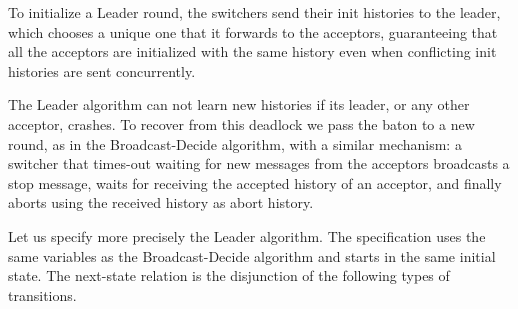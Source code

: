 To initialize a Leader round, the switchers send their init histories to the leader, which chooses a unique one that it forwards to the acceptors, guaranteeing that all the acceptors are initialized with the same history even when conflicting init histories are sent concurrently.

The Leader algorithm can not learn new histories if its leader, or any other acceptor, crashes.
To recover from this deadlock we pass the baton to a new round, as in the Broadcast-Decide algorithm, with a similar mechanism: a switcher that times-out waiting for new messages from the acceptors broadcasts a stop message, waits for receiving the accepted history of an acceptor, and finally aborts using the received history as abort history. 

Let us specify more precisely the Leader algorithm.
The specification uses the same variables as the Broadcast-Decide algorithm and starts in the same initial state. 
The next-state relation is the disjunction of the following types of
transitions. 
